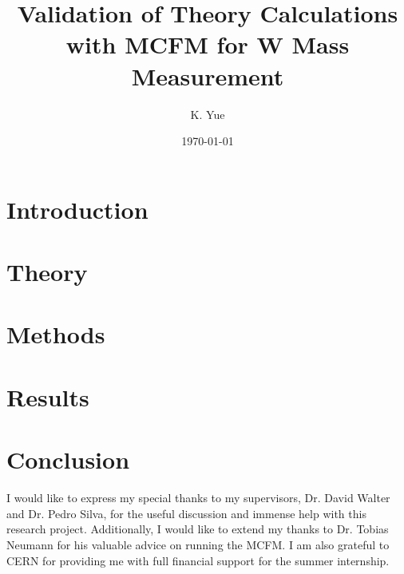 \documentclass[reprint, amsmath, amssymb, aps, superscriptaddress]{revtex4-2}
\begin{document}
\title{Validation of Theory Calculations with MCFM for W Mass Measurement}
\author{K. Yue}


\date{\today}
\begin{abstract}
\end{abstract}

\maketitle

\section{Introduction}

\section{Theory}

\section{Methods}

\section{Results}

\section{Conclusion}

\begin{acknowledgements}
I would like to express my special thanks to my supervisors, Dr. David Walter and Dr. Pedro Silva, for the useful discussion and immense help with this research project. Additionally, I would like to extend my thanks to Dr. Tobias Neumann for his valuable advice on running the MCFM. I am also grateful to CERN for providing me with full financial support for the summer internship.
\end{acknowledgements}

\appendix

\nocite{*}

\end{document}
